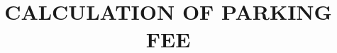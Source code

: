 \documentclass[onluarkali,turkce,yukseklisans,karton,""]{tezSablon}
\title{CALCULATION OF PARKING FEE }{WİTH PLATE RECOGNITION SYSTEM}{IN PARKING AREAS }
\begin{document}
 
                              



        




\ozgecmis{}
\end{document}

